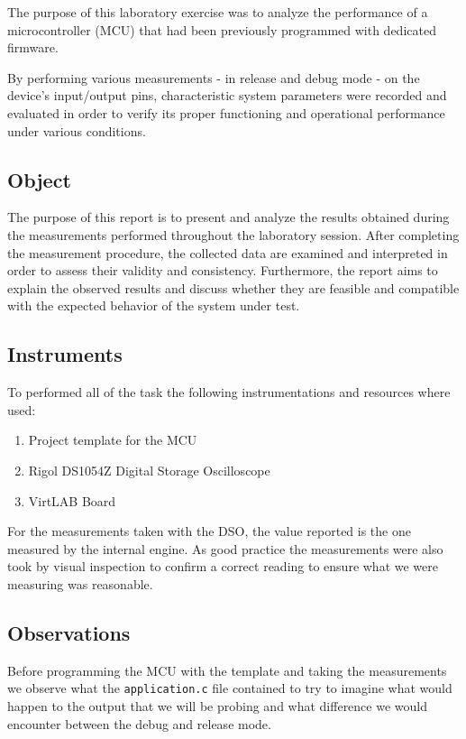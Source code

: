 \documentclass[../main.tex]{subfiles}
\begin{document}
The purpose of this laboratory exercise was to analyze the performance of a microcontroller (MCU) that had been previously programmed with dedicated firmware. 

By performing various measurements - in release and debug mode - on the device’s input/output pins, characteristic system parameters were recorded and evaluated in order to verify its proper functioning and operational performance under various conditions.


\subsection*{Object}

The purpose of this report is to present and analyze the results obtained during the measurements performed throughout the laboratory session. After completing the measurement procedure, the collected data are examined and interpreted in order to assess their validity and consistency. Furthermore, the report aims to explain the observed results and discuss whether they are feasible and compatible with the expected behavior of the system under test.

\subsection*{Instruments} 

To performed all of the task the following instrumentations and resources where used:

\begin{enumerate}[label=\textbf{-}]
	\item Project template for the MCU
	\item Rigol DS1054Z Digital Storage Oscilloscope 
	\item VirtLAB Board
\end{enumerate}

For the measurements taken with the DSO, the value reported is the one measured by the internal engine. As good practice the measurements were also took by visual inspection to confirm a correct reading to ensure what we were measuring was reasonable.

\subsection*{Observations}

Before programming the MCU with the template and taking the measurements we observe what the \texttt{application.c} file contained to try to imagine what would happen to the output that we will be probing and what difference we would encounter between the debug and release mode.\\
\end{document}
